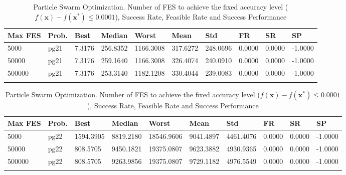 \documentclass[10pt, a4paper]{book}
\begin{document}
\begin{center}
\begin{longtable}{l l l l l l l l l l}
\textbf{Max FES} & \textbf{Prob.} & \textbf{Best} & \textbf{Median} & \textbf{Worst} & \textbf{Mean} & \textbf{Std} & \textbf{FR} & \textbf{SR} & \textbf{SP} \\
\hline
5000 & pg21 & 7.3176 & 256.8352 & 1166.3008 & 317.6272 & 248.0696 & 0.0000 & 0.0000 & -1.0000 \\
50000 & pg21 & 7.3176 & 259.1640 & 1166.3008 & 326.4074 & 240.0910 & 0.0000 & 0.0000 & -1.0000 \\
500000 & pg21 & 7.3176 & 253.3140 & 1182.1208 & 330.4044 & 239.0083 & 0.0000 & 0.0000 & -1.0000 \\

\caption{ Particle Swarm Optimization. Number of FES to achieve the fixed accuracy level ($f(\mathbf{x}) - f(\mathbf{x}^{*}) \leq 0.0001$), Success Rate, Feasible Rate and Success Performance }
\end{longtable}
\end{center}

\begin{center}
\begin{longtable}{l l l l l l l l l l}
\textbf{Max FES} & \textbf{Prob.} & \textbf{Best} & \textbf{Median} & \textbf{Worst} & \textbf{Mean} & \textbf{Std} & \textbf{FR} & \textbf{SR} & \textbf{SP} \\
\hline
5000 & pg22 & 1594.3905 & 8819.2180 & 18546.9606 & 9041.4897 & 4461.4076 & 0.0000 & 0.0000 & -1.0000 \\
50000 & pg22 & 808.5705 & 9450.1821 & 19375.0807 & 9623.3882 & 4930.9365 & 0.0000 & 0.0000 & -1.0000 \\
500000 & pg22 & 808.5705 & 9263.9856 & 19375.0807 & 9729.1182 & 4976.5549 & 0.0000 & 0.0000 & -1.0000 \\

\caption{ Particle Swarm Optimization. Number of FES to achieve the fixed accuracy level ($f(\mathbf{x}) - f(\mathbf{x}^{*}) \leq 0.0001$), Success Rate, Feasible Rate and Success Performance }
\end{longtable}
\end{center}
\end{document}
